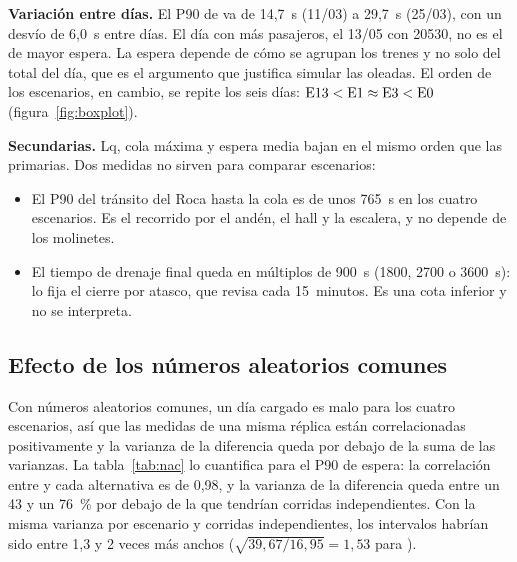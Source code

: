 \textbf{Variación entre días.} El P90 de \EO{} va de 14,7~s (11/03) a 29,7~s (25/03), con un desvío de 6,0~s
entre días. El día con más pasajeros, el 13/05 con \num{20530}, no es el de mayor espera. La espera depende de
cómo se agrupan los trenes y no solo del total del día, que es el argumento que justifica simular las
oleadas. El orden de los escenarios, en cambio, se repite los seis días: $\mbox{E13}{} < \mbox{E1}{} \approx \mbox{E3}{} < \mbox{E0}{}$
(figura~\ref{fig:boxplot}).

\textbf{Secundarias.} Lq, cola máxima y espera media bajan en el mismo orden que las primarias. Dos medidas no
sirven para comparar escenarios:
\begin{itemize}
  \item El P90 del tránsito del Roca hasta la cola es de unos 765~s en los cuatro escenarios. Es el recorrido
        por el andén, el hall y la escalera, y no depende de los molinetes.
  \item El tiempo de drenaje final queda en múltiplos de 900~s (1800, 2700 o 3600~s): lo fija el cierre por
        atasco, que revisa cada 15~minutos. Es una cota inferior y no se interpreta.
\end{itemize}

\subsection{Efecto de los números aleatorios comunes}
\label{anx:nac}

Con números aleatorios comunes, un día cargado es malo para los cuatro escenarios, así que las medidas de una
misma réplica están correlacionadas positivamente y la varianza de la diferencia queda por debajo de la suma de
las varianzas. La tabla~\ref{tab:nac} lo cuantifica para el P90 de espera: la correlación entre \EO{} y cada
alternativa es de 0,98, y la varianza de la diferencia queda entre un 43 y un 76~\% por debajo de la que
tendrían corridas independientes. Con la misma varianza por escenario y corridas independientes, los intervalos
habrían sido entre 1,3 y 2 veces más anchos ($\sqrt{39{,}67/16{,}95} = 1{,}53$ para \EI{}).

